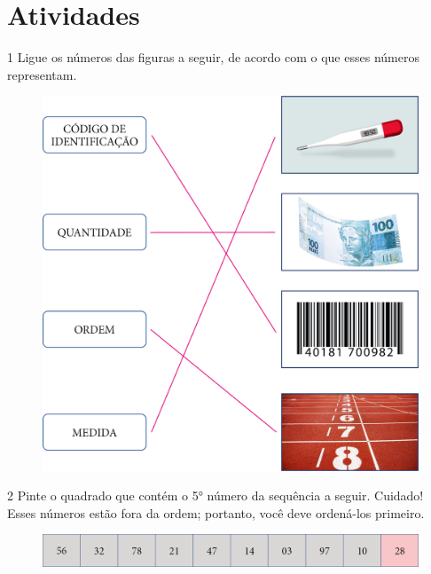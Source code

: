 \pagebreak
\section*{Atividades}

\num{1} Ligue os números das figuras a seguir, de acordo com o que esses números representam.


\begin{figure}[htpb!]
\centering
\includegraphics[width=.8\textwidth]{./media/image3.png}
\end{figure}


\num{2} Pinte o quadrado que contém o 5° número da sequência a seguir.
Cuidado! Esses números estão fora da ordem; portanto, você deve
ordená-los primeiro.

\begin{figure}[htpb!]
\includegraphics[width=\textwidth]{./media/image4.png}
\end{figure}

